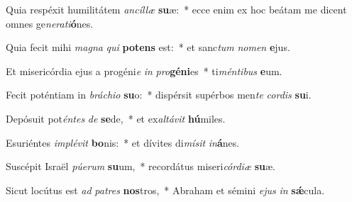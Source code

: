 \item Quia respéxit humilitátem \textit{an}\textit{cíl}\textit{læ} \textbf{su}æ:~* ecce enim ex hoc beátam me dicent omnes ge\textit{ne}\textit{ra}\textit{ti}\textbf{ó}nes.
\item Quia fecit mihi \textit{ma}\textit{gna} \textit{qui} \textbf{pot}\textbf{ens} est:~* et sanc\textit{tum} \textit{no}\textit{men} \textbf{e}jus.
\item Et misericórdia ejus a progéni\textit{e} \textit{in} \textit{pro}\textbf{gé}\textbf{ni}es~* ti\textit{mén}\textit{ti}\textit{bus} \textbf{e}um.
\item Fecit poténtiam in \textit{brá}\textit{chi}\textit{o} \textbf{su}o:~* dispérsit supérbos men\textit{te} \textit{cor}\textit{dis} \textbf{su}i.
\item Depósuit pot\textit{én}\textit{tes} \textit{de} \textbf{se}de,~* et ex\textit{al}\textit{tá}\textit{vit} \textbf{hú}miles.
\item Esuriéntes \textit{im}\textit{plé}\textit{vit} \textbf{bo}nis:~* et dívites di\textit{mí}\textit{sit} \textit{in}\textbf{á}nes.
\item Suscépit Israël \textit{pú}\textit{e}\textit{rum} \textbf{su}um,~* recordátus miseri\textit{cór}\textit{di}\textit{æ} \textbf{su}æ.
\item Sicut locútus est \textit{ad} \textit{pa}\textit{tres} \textbf{nos}tros,~* Abraham et sémini \textit{e}\textit{jus} \textit{in} \textbf{sǽ}cula.
